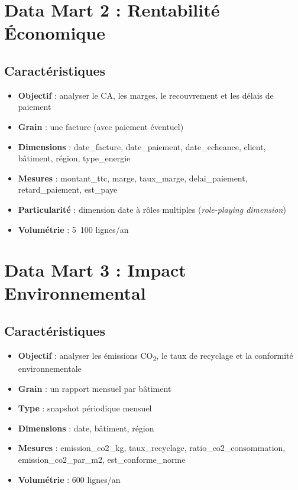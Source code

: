 \documentclass[12pt,a4paper]{report}
\begin{document}
\section{Data Mart 2 : Rentabilité Économique}

\subsection{Caractéristiques}

\begin{itemize}
    \item \textbf{Objectif} : analyser le CA, les marges, le recouvrement et les délais de paiement
    \item \textbf{Grain} : une facture (avec paiement éventuel)
    \item \textbf{Dimensions} : date\_facture, date\_paiement, date\_echeance, client, bâtiment, région, type\_energie
    \item \textbf{Mesures} : montant\_ttc, marge, taux\_marge, delai\_paiement, retard\_paiement, est\_paye
    \item \textbf{Particularité} : dimension date à rôles multiples (\textit{role-playing dimension})
    \item \textbf{Volumétrie} : 5~100 lignes/an
\end{itemize}

\section{Data Mart 3 : Impact Environnemental}

\subsection{Caractéristiques}

\begin{itemize}
    \item \textbf{Objectif} : analyser les émissions CO\textsubscript{2}, le taux de recyclage et la conformité environnementale
    \item \textbf{Grain} : un rapport mensuel par bâtiment
    \item \textbf{Type} : snapshot périodique mensuel
    \item \textbf{Dimensions} : date, bâtiment, région
    \item \textbf{Mesures} : emission\_co2\_kg, taux\_recyclage, ratio\_co2\_consommation, emission\_co2\_par\_m2, est\_conforme\_norme
    \item \textbf{Volumétrie} : 600 lignes/an
\end{itemize}
\end{document}
